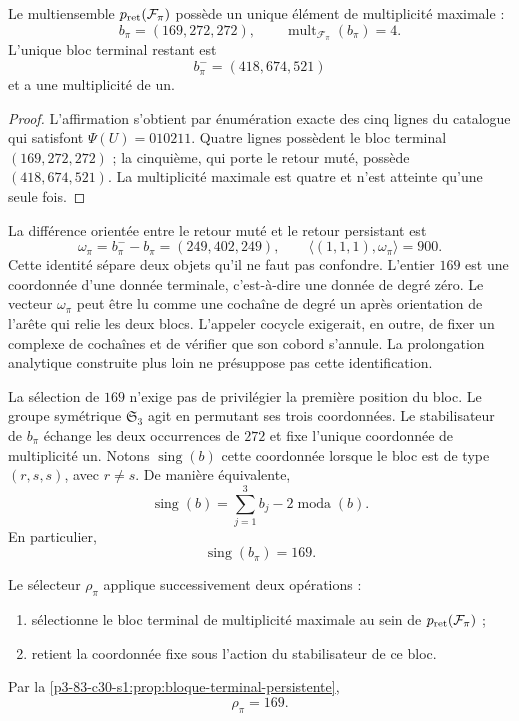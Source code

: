 \begin{proposition}
\label{p3-83-c30-s1:prop:bloque-terminal-persistente}
Le multiensemble \(p_{\rm ret}(\mathcal F_\pi)\) possède un unique élément de
multiplicité maximale :
\[
b_\pi=(169,272,272),
\qquad
\operatorname{mult}_{\mathcal F_\pi}(b_\pi)=4.
\]
L'unique bloc terminal restant est
\[
b_\pi^-=(418,674,521)
\]
et a une multiplicité de un.
\end{proposition}

\begin{proof}
L'affirmation s'obtient par énumération exacte des cinq lignes du catalogue qui satisfont \(\Psi(U)=010211\). Quatre lignes possèdent le bloc terminal \((169,272,272)\) ; la cinquième, qui porte le retour muté, possède \((418,674,521)\). La multiplicité maximale est quatre et n'est atteinte qu'une seule fois.
\end{proof}

La différence orientée entre le retour muté et le retour persistant est
\[
 \omega_\pi=b_\pi^- - b_\pi=(249,402,249),
 \qquad
 \langle(1,1,1),\omega_\pi\rangle=900.
\]
Cette identité sépare deux objets qu'il ne faut pas confondre. L'entier
\(169\) est une coordonnée d'une donnée terminale, c'est-à-dire une donnée de degré
zéro. Le vecteur \(\omega_\pi\) peut être lu comme une cochaîne de degré un
après orientation de l'arête qui relie les deux blocs. L'appeler cocycle exigerait,
en outre, de fixer un complexe de cochaînes et de vérifier que son cobord s'annule.
La prolongation analytique construite plus loin ne présuppose pas cette
identification.

La sélection de \(169\) n'exige pas de privilégier la première position du bloc.
Le groupe symétrique \(\mathfrak S_3\) agit en permutant ses trois coordonnées.
Le stabilisateur de \(b_\pi\) échange les deux occurrences de \(272\) et
fixe l'unique coordonnée de multiplicité un. Notons
\(\operatorname{sing}(b)\) cette coordonnée lorsque le bloc est de type
\((r,s,s)\), avec \(r\ne s\). De manière équivalente,
\[
\operatorname{sing}(b)
=\sum_{j=1}^3b_j-2\operatorname{moda}(b).
\]
En particulier,
\[
\boxed{\operatorname{sing}(b_\pi)=169.}
\]

\begin{definition}
\label{p3-83-c30-s1:def:selector-residual-pi}
Le sélecteur \(\rho_\pi\) applique successivement deux opérations :
\begin{enumerate}
  \item sélectionne le bloc terminal de multiplicité maximale au sein de \(p_{\rm ret}(\mathcal F_\pi)\) ;
  \item retient la coordonnée fixe sous l'action du stabilisateur de ce bloc.
\end{enumerate}
Par la \cref{p3-83-c30-s1:prop:bloque-terminal-persistente},
\[
\boxed{\rho_\pi=169.}
\]
\end{definition}

